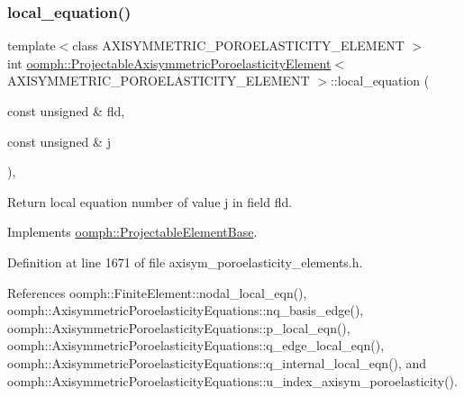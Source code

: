 \subsubsection{\texorpdfstring{local\+\_\+equation()}{local\_equation()}}
{\footnotesize\ttfamily template$<$class A\+X\+I\+S\+Y\+M\+M\+E\+T\+R\+I\+C\+\_\+\+P\+O\+R\+O\+E\+L\+A\+S\+T\+I\+C\+I\+T\+Y\+\_\+\+E\+L\+E\+M\+E\+NT $>$ \\
int \hyperlink{classoomph_1_1ProjectableAxisymmetricPoroelasticityElement}{oomph\+::\+Projectable\+Axisymmetric\+Poroelasticity\+Element}$<$ A\+X\+I\+S\+Y\+M\+M\+E\+T\+R\+I\+C\+\_\+\+P\+O\+R\+O\+E\+L\+A\+S\+T\+I\+C\+I\+T\+Y\+\_\+\+E\+L\+E\+M\+E\+NT $>$\+::local\+\_\+equation (\begin{DoxyParamCaption}\item[{const unsigned \&}]{fld,  }\item[{const unsigned \&}]{j }\end{DoxyParamCaption})\hspace{0.3cm}{\ttfamily [inline]}, {\ttfamily [virtual]}}



Return local equation number of value j in field fld. 



Implements \hyperlink{classoomph_1_1ProjectableElementBase_ac5c27ae929ff636dc7747fe23fd4f738}{oomph\+::\+Projectable\+Element\+Base}.



Definition at line 1671 of file axisym\+\_\+poroelasticity\+\_\+elements.\+h.



References oomph\+::\+Finite\+Element\+::nodal\+\_\+local\+\_\+eqn(), oomph\+::\+Axisymmetric\+Poroelasticity\+Equations\+::nq\+\_\+basis\+\_\+edge(), oomph\+::\+Axisymmetric\+Poroelasticity\+Equations\+::p\+\_\+local\+\_\+eqn(), oomph\+::\+Axisymmetric\+Poroelasticity\+Equations\+::q\+\_\+edge\+\_\+local\+\_\+eqn(), oomph\+::\+Axisymmetric\+Poroelasticity\+Equations\+::q\+\_\+internal\+\_\+local\+\_\+eqn(), and oomph\+::\+Axisymmetric\+Poroelasticity\+Equations\+::u\+\_\+index\+\_\+axisym\+\_\+poroelasticity().

\mbox{\label{classoomph_1_1ProjectableAxisymmetricPoroelasticityElement_a593b32549e17dedf66365bf3fd202536}} 
